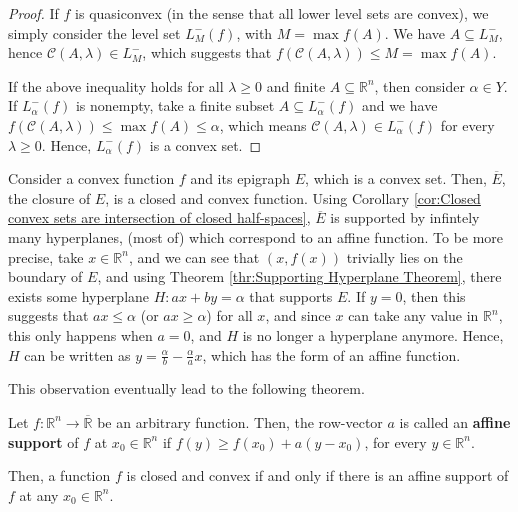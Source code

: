 \begin{proof}
  If \( f \) is quasiconvex (in the sense that all lower level sets are convex),
  we simply consider the level set \( L_{M}^{-}(f) \), with \( M = \max f(A) \).
  We have \( A \subseteq L_{M}^{-} \), hence \( \mathcal{C}(A, \lambda) \in
  L_{M}^{-} \), which suggests that \( f(\mathcal{C}(A, \lambda)) \le M = \max
  f(A) \).

  If the above inequality holds for all \( \lambda \ge 0 \) and finite \( A
  \subseteq \mathbb{R}^{n} \), then consider \( \alpha \in Y \). If \(
  L_{\alpha}^{-}(f) \) is nonempty, take a finite subset \( A \subseteq
  L_{\alpha}^{-}(f) \) and we have \( f(\mathcal{C}(A, \lambda)) \le \max f(A)
  \le \alpha \), which means \( \mathcal{C}(A, \lambda) \in L_{\alpha}^{-}(f) \)
  for every \( \lambda \ge 0 \). Hence, \( L_{\alpha}^{-}(f) \) is a convex set.
\end{proof}

Consider a convex function \( f \) and its epigraph \( E \), which is a convex set.
Then, \( \overline{E} \), the closure of \( E \), is a closed and convex
function. Using Corollary \ref{cor:Closed convex sets are intersection of closed
half-spaces}, \( \overline{E} \) is supported by infintely many hyperplanes,
(most of) which correspond to an affine function. To be more precise, take \( x
\in \mathbb{R}^{n}\), and we can see that \( (x, f(x)) \) trivially lies on the
boundary of \( E \), and using Theorem \ref{thr:Supporting Hyperplane Theorem},
there exists some hyperplane \( H: ax + by = \alpha \) that supports \( E \).
If \( y = 0 \), then this suggests that \( ax \le \alpha \) (or \( ax \ge \alpha
\)) for all \( x \), and since \( x \) can take any value in \( \mathbb{R}^{n}
\), this only happens when \( a = 0 \), and \( H \) is no longer a hyperplane
anymore. Hence, \( H \) can be written as \( y = \frac{\alpha}{b} -
\frac{\alpha}{a}x \), which has the form of an affine function.

This observation eventually lead to the following theorem.

\begin{theorem}
\label{thr:Affine support of convex functions}
  Let \( f: \mathbb{R}^{n} \to  \overline{\mathbb{R}}  \) be an arbitrary
  function. Then, the row-vector \( a \) is called an \textbf{affine
  support} of \( f \) at \( x_{0} \in \mathbb{R}^{n} \) if \( f(y) \ge f(x_{0})
  + a(y - x_{0}) \), for every \( y \in \mathbb{R}^{n} \).

  Then, a function \( f \) is closed and convex if and only if there is an
  affine support of \( f \) at any \( x_{0} \in \mathbb{R}^{n} \).
\end{theorem}

